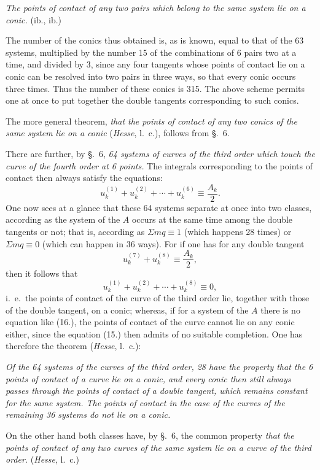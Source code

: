 \documentclass{article}
\begin{document}

\emph{The points of contact of any two pairs which belong to the same system lie on a conic.} (ib., ib.)

The number of the conics thus obtained is, as is known, equal to that of the 63 systems, multiplied by the number 15 of the combinations of 6 pairs two at a time, and divided by 3, since any four tangents whose points of contact lie on a conic can be resolved into two pairs in three ways, so that every conic occurs three times. Thus the number of these conics is 315. The above scheme permits one at once to put together the double tangents corresponding to such conics.

The more general theorem, \emph{that the points of contact of any two conics of the same system lie on a conic} (\emph{Hesse}, l.\ c.), follows from §.~6.

There are further, by §.~6, \emph{64 systems of curves of the third order which touch the curve of the fourth order at 6 points.} The integrals corresponding to the points of contact then always satisfy the equations:
\[
u_{k}^{(1)}+u_{k}^{(2)}+\cdots+u_{k}^{(6)} \equiv \frac{A_{k}}{2}. \tag{15.}
\]
One now sees at a glance that these 64 systems separate at once into two classes, according as the system of the $A$ occurs at the same time among the double tangents or not; that is, according as $\Sigma mq \equiv 1$ (which happens 28 times) or $\Sigma mq \equiv 0$ (which can happen in 36 ways). For if one has for any double tangent
\[
u_{k}^{(7)}+u_{k}^{(8)} \equiv \frac{A_{k}}{2}, \tag{16.}
\]
then it follows that
\[
u_{k}^{(1)}+u_{k}^{(2)}+\cdots+u_{k}^{(8)} \equiv 0,
\]
i.\ e.\ the points of contact of the curve of the third order lie, together with those of the double tangent, on a conic; whereas, if for a system of the $A$ there is no equation like (16.), the points of contact of the curve cannot lie on any conic either, since the equation (15.) then admits of no suitable completion. One has therefore the theorem (\emph{Hesse}, l.\ c.):

\emph{Of the 64 systems of the curves of the third order, 28 have the property that the 6 points of contact of a curve lie on a conic, and every conic then still always passes through the points of contact of a double tangent, which remains constant for the same system. The points of contact in the case of the curves of the remaining 36 systems do not lie on a conic.}


On the other hand both classes have, by §.~6, the common property \emph{that the points of contact of any two curves of the same system lie on a curve of the third order.} (\emph{Hesse}, l.\ c.)
\end{document}
